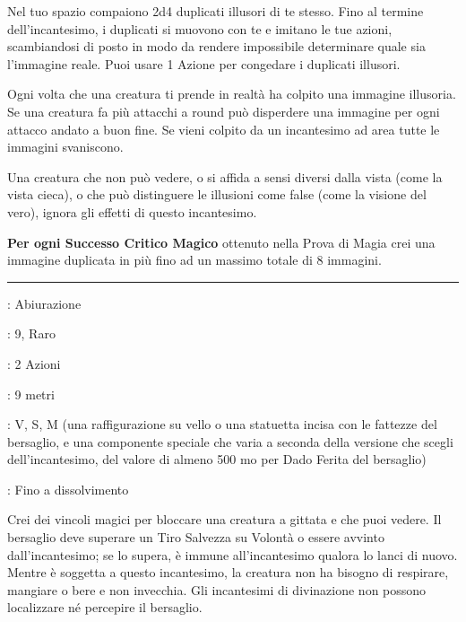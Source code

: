 \begin{multicols}{2}
Nel tuo spazio compaiono 2d4 duplicati illusori di te stesso. Fino al termine dell'incantesimo, i duplicati si muovono con te e imitano le tue azioni, scambiandosi di posto in modo da rendere impossibile determinare quale sia l'immagine reale. Puoi usare 1 Azione per congedare i duplicati illusori.

Ogni volta che una creatura ti prende in realtà ha colpito una immagine illusoria.
Se una creatura fa più attacchi a round può disperdere una immagine per ogni attacco andato a buon fine. Se vieni colpito da un incantesimo ad area tutte le immagini svaniscono.

Una creatura che non può vedere, o si affida a sensi diversi dalla vista (come la vista cieca), o che può distinguere le illusioni come false (come la visione del vero), ignora gli effetti di questo incantesimo.

\textbf{Per ogni Successo Critico Magico} ottenuto nella Prova di Magia crei una immagine duplicata in più fino ad un massimo totale di 8 immagini.

\smallskip\noindent\rule{\linewidth}{2pt} \hypertarget{Imprigionare}{}\smallskip{}
\noindent
\begin{description}[noitemsep, topsep=0pt, parsep=0pt, partopsep=0pt, leftmargin=0cm, labelwidth=2.8cm]
	\item[\textbf{Lista di Magia}]: Abiurazione
	\item[\textbf{Livello}]: 9, Raro
	\item[\textbf{T. di Lancio}]: 2 Azioni
	\item[\textbf{Gittata}]: 9 metri
	\item[\textbf{Componenti}]: V, S, M (una raffigurazione su vello o una statuetta incisa con le fattezze del bersaglio, e una componente speciale che varia a seconda della versione che scegli dell'incantesimo, del valore di almeno 500 mo per Dado Ferita del bersaglio)
	\item[\textbf{Durata}]: Fino a dissolvimento
\end{description}

Crei dei vincoli magici per bloccare una creatura a gittata e che puoi vedere. Il bersaglio deve superare un Tiro Salvezza su Volontà o essere avvinto dall'incantesimo; se lo supera, è immune all'incantesimo qualora lo lanci di nuovo. Mentre è soggetta a questo incantesimo, la creatura non ha bisogno di respirare, mangiare o bere e non invecchia. Gli incantesimi di divinazione non possono localizzare né percepire il bersaglio.


\end{multicols}
